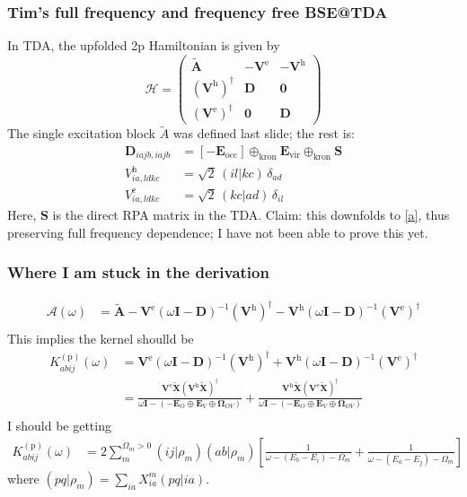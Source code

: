 \documentclass{beamer}
\begin{document}
\begin{frame}
\frametitle{Tim's full frequency and frequency free BSE@TDA}
In TDA, the upfolded 2p Hamiltonian is given by
\begin{equation}
\mathcal{H}=
\begin{pmatrix}
\mathbf{\tilde{A}} & -\mathbf{V}^{\mathrm{e}} & -\mathbf{V}^{\mathrm{h}} \\
\left(\mathbf{V}^{\mathrm{h}}\right)^{\dagger} & \mathbf{D} & \mathbf{0} \\
\left(\mathbf{V}^{\mathrm{e}}\right)^{\dagger} & \mathbf{0} & \mathbf{D}
\end{pmatrix}
\end{equation}
The single excitation block $\tilde{A}$ was defined last slide; the rest is:
\begin{align}
\mathbf{D}_{iajb,iajb} &= \left[-\boldsymbol{E}_{\mathrm{occ}}\right] \oplus_{\text{kron}} \boldsymbol{E}_{\mathrm{vir}} \oplus_{\text{kron}} \mathbf{S} \\
V_{ia,ldkc}^{\mathrm{h}} &= \sqrt{2}\,(il|kc)\,\delta_{ad} \\
V_{ia,ldkc}^{\mathrm{e}} &= \sqrt{2}\,(kc|ad)\,\delta_{il}
\end{align}
Here, $\mathbf{S}$ is the direct RPA matrix in the TDA. Claim: this downfolds to \ref{a}, thus preserving full frequency dependence; I have not been able to prove this yet.
\end{frame}

\begin{frame}
\frametitle{Where I am stuck in the derivation}
\begin{align}
\mathcal{A}(\omega)
&= \tilde{\mathbf{A}} - \mathbf{V}^{\mathrm{e}}(\omega \mathbf{I} - \mathbf{D})^{-1} (\mathbf{V}^{\mathrm{h}})^{\dagger} - \mathbf{V}^{\mathrm{h}}(\omega \mathbf{I} - \mathbf{D})^{-1} (\mathbf{V}^{\mathrm{e}})^{\dagger} \\
\end{align}
This implies the kernel shoulld be
\begin{align}
K_{abij}^{(\mathrm{p})}(\omega) &= \mathbf{V}^{\mathrm{e}}(\omega \mathbf{I} - \mathbf{D})^{-1} (\mathbf{V}^{\mathrm{h}})^{\dagger} + \mathbf{V}^{\mathrm{h}}(\omega \mathbf{I} - \mathbf{D})^{-1} (\mathbf{V}^{\mathrm{e}})^{\dagger} \\
&= \frac{\mathbf{V}^{\mathrm{e}} \bm{\tilde{X}}  (\bm{V}^{\mathrm{h}}\bm{\tilde{X}})^{\dagger}}{\omega \mathbf{I} - \left(-\bm{E}_O \oplus \bm{E}_V \oplus \bm{\Omega }_{OV}\right)} + \frac{\bm{V}^{\mathrm{h}} \bm{\tilde{X}}  (\bm{V}^{\mathrm{e}}\bm{\tilde{X}})^{\dagger}}{\omega \mathbf{I} - \left(-\bm{E}_O \oplus \bm{E}_V \oplus \bm{\Omega }_{OV}\right)} \\
\end{align}
I should be getting
\begin{align}
K_{abij}^{(\mathrm{p})}(\omega) &= 2 \sum_m^{\Omega_m>0}\left(i j| \rho_m\right)\left(a b|\rho_m\right)\left[\frac{1}{\omega-\left(E_b-E_i\right)-\Omega_m}+\frac{1}{\omega-\left(E_a-E_j\right)-\Omega_m}\right]
\end{align}
where $\left(p q | \rho_m\right)=\sum_{i a} X_{i a}^m(p q | i a)$.

\end{frame}
\end{document}
